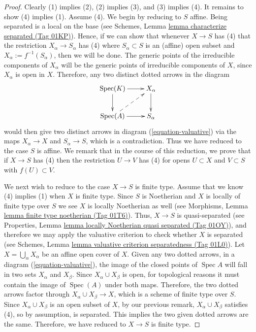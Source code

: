 \documentclass{amsart}
\theoremstyle{plain}
\theoremstyle{definition}
\theoremstyle{remark}
\numberwithin{equation}{subsection}
\def\Spec{\mathop{\mathrm{Spec}}}
\begin{document}
\begin{proof}
Clearly (1) implies (2), (2) implies (3), and (3) implies (4).  It
remains to show (4) implies (1). Assume (4).
We begin by reducing to $S$ affine.  Being separated is a local
on the base (see
Schemes, Lemma \href{https://stacks.math.columbia.edu/tag/01KP}{lemma characterize separated (Tag 01KP)}).
Hence, if we can show that whenever
$X \to S$ has (4) that the restriction $X_\alpha \to S_\alpha$ has (4)
where $S_\alpha \subset S$ is an (affine) open subset and $X_\alpha :=
f^{-1}(S_\alpha)$, then we will be done.  The
generic points of the irreducible components of $X_\alpha$ will be the
generic points of irreducible components of $X$, since $X_\alpha$ is
open in $X$.  Therefore, any two distinct dotted arrows in the diagram
\begin{equation}
\label{equation-valuative-alpha}
\xymatrix{
\Spec(K) \ar[r] \ar[d] & X_\alpha \ar[d] \\
\Spec(A) \ar[r] \ar@{-->}[ru] & S_\alpha
}
\end{equation}
would then give two distinct arrows in diagram
(\ref{equation-valuative}) via the maps $X_\alpha \to X$ and
$S_\alpha \to S$, which is a contradiction.  Thus we have reduced
to the case $S$ is affine.  We remark that in the course of this
reduction, we prove that if $X \to S$ has (4) then the restriction $U
\to V$ has (4) for opens $U \subset X$ and $V \subset S$ with
$f(U) \subset V$.

\medskip\noindent
We next wish to reduce to the case $X \to S$ is finite type.  Assume
that we know (4) implies (1) when $X$ is finite type. Since
$S$ is Noetherian and $X$ is locally of finite type over $S$
we see $X$ is locally Noetherian as well (see Morphisms,
Lemma \href{https://stacks.math.columbia.edu/tag/01T6}{lemma finite type noetherian (Tag 01T6)}).
Thus, $X \to S$ is quasi-separated (see
Properties, Lemma \href{https://stacks.math.columbia.edu/tag/01OY}{lemma locally Noetherian quasi separated (Tag 01OY)}),
and therefore we may apply the valuative criterion to check whether $X$
is separated (see
Schemes, Lemma \href{https://stacks.math.columbia.edu/tag/01L0}{lemma valuative criterion separatedness (Tag 01L0)}).
Let $X = \bigcup_\alpha X_\alpha$ be an affine open
cover of $X$. Given any two dotted arrows, in a diagram
(\ref{equation-valuative}), the image of the closed points of
$\Spec A$ will
fall in two sets $X_\alpha$ and $X_\beta$.  Since $X_\alpha \cup
X_\beta$ is open, for topological reasons it must contain the image of
$\Spec(A)$ under both maps. Therefore, the two dotted arrows factor
through $X_\alpha \cup X_\beta \to X$, which is a scheme of finite type over
$S$. Since $X_\alpha \cup X_\beta$ is an open subset of $X$, by our
previous remark, $X_\alpha \cup X_\beta$ satisfies (4), so by
assumption, is separated.  This implies the two given dotted
arrows are the same. Therefore, we have reduced to $X \to S$ is finite type.


\end{proof}
\end{document}
